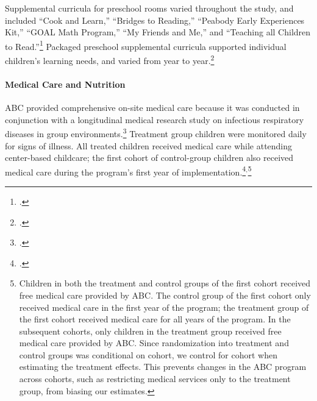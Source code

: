 \begin{appendices}
\noindent Supplemental curricula for preschool rooms varied throughout the study, and included ``Cook and Learn,'' ``Bridges to Reading,'' ``Peabody Early Experiences Kit,'' ``GOAL Math Program,'' ``My Friends and Me,'' and ``Teaching all Children to Read.''\footnote{ \citet{Greenberg_Epstein_1973_BOOKBridgestoreading,Karnes1973,Dunn_Chun_etal_1976_BOOKPeabodyearlyeducation,Davis_1977_BOOKMyfriends,Wallach_1976_Teaching-All-Children}.} Packaged preschool supplemental curricula supported individual children's learning needs, and varied from year to year.\footnote{ \citet{Ramey_McGinness_etal_1982_Abecedarianapproach,Mcginness_1981_Developing,Finkelstein_1982_Day_Care_YC,Wasik_Ramey_etal_1990_CD}.}\\

\paragraph{Medical Care and Nutrition}
ABC provided comprehensive on-site medical care because it was conducted in conjunction with a longitudinal medical research study on infectious respiratory diseases in group environments.\footnote{\citet{Henderson-et-al_1982_NEJoM}.} Treatment group children were monitored daily for signs of illness. All treated children received medical care while attending center-based childcare; the first cohort of control-group children also received medical care during the program's first year of implementation.\footnote{\citet{Ramey_Collier_etal_1976_CarolinaAbecedarianProject,Ramey_Campbell_1991_childreninpoverty,Campbell_Ramey_1994_CD}.}$^{,}$\footnote{Children in both the treatment and control groups of the first cohort received free medical care provided by ABC. The control group of the first cohort only received medical care in the first year of the program; the treatment group of the first cohort received medical care for all years of the program. In the subsequent cohorts, only children in the treatment group received free medical care provided by ABC. Since randomization into treatment and control groups was conditional on cohort, we control for cohort when estimating the treatment effects. This prevents changes in the ABC program across cohorts, such as restricting medical services only to the treatment group, from biasing our estimates.}\\


\end{appendices}
